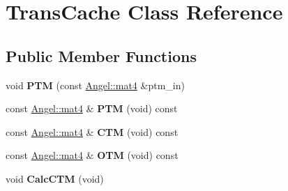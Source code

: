 \hypertarget{class_trans_cache}{\section{Trans\-Cache Class Reference}
\label{class_trans_cache}
}
\subsection*{Public Member Functions}
\begin{DoxyCompactItemize}
\item 
\hypertarget{class_trans_cache_a3a7d869c5a99b33f10c0e74ac082cfb4}{void {\bfseries P\-T\-M} (const \hyperlink{class_angel_1_1mat4}{Angel\-::mat4} \&ptm\-\_\-in)}\label{class_trans_cache_a3a7d869c5a99b33f10c0e74ac082cfb4}

\item 
\hypertarget{class_trans_cache_a7b425ff8ded5fb458e21ab4660785038}{const \hyperlink{class_angel_1_1mat4}{Angel\-::mat4} \& {\bfseries P\-T\-M} (void) const }\label{class_trans_cache_a7b425ff8ded5fb458e21ab4660785038}

\item 
\hypertarget{class_trans_cache_ac9396813c4f26840c9c5e825d2a56fef}{const \hyperlink{class_angel_1_1mat4}{Angel\-::mat4} \& {\bfseries C\-T\-M} (void) const }\label{class_trans_cache_ac9396813c4f26840c9c5e825d2a56fef}

\item 
\hypertarget{class_trans_cache_ac1ca33b96c384988bb7a46a250d441bd}{const \hyperlink{class_angel_1_1mat4}{Angel\-::mat4} \& {\bfseries O\-T\-M} (void) const }\label{class_trans_cache_ac1ca33b96c384988bb7a46a250d441bd}

\item 
\hypertarget{class_trans_cache_ac197a0d239be72c6c620bfe002f3880b}{void {\bfseries Calc\-C\-T\-M} (void)}\label{class_trans_cache_ac197a0d239be72c6c620bfe002f3880b}

\end{DoxyCompactItemize}
